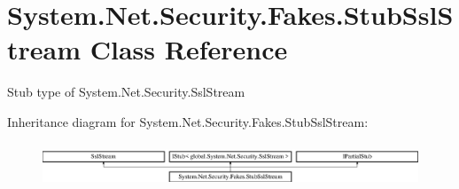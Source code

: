 \hypertarget{class_system_1_1_net_1_1_security_1_1_fakes_1_1_stub_ssl_stream}{\section{System.\-Net.\-Security.\-Fakes.\-Stub\-Ssl\-Stream Class Reference}
\label{class_system_1_1_net_1_1_security_1_1_fakes_1_1_stub_ssl_stream}
}


Stub type of System.\-Net.\-Security.\-Ssl\-Stream 


Inheritance diagram for System.\-Net.\-Security.\-Fakes.\-Stub\-Ssl\-Stream\-:\begin{figure}[H]
\begin{center}
\leavevmode
\includegraphics[height=1.314554cm]{class_system_1_1_net_1_1_security_1_1_fakes_1_1_stub_ssl_stream}
\end{center}
\end{figure}
